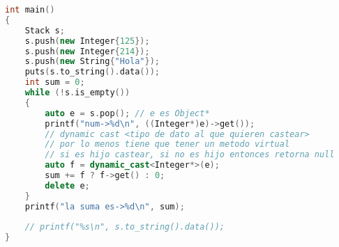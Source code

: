 \begin{lstlisting}[language=C++, caption={Aplicacion de polimorfismo}]
int main()
{
    Stack s;
    s.push(new Integer{125});
    s.push(new Integer{214});
    s.push(new String{"Hola"});
    puts(s.to_string().data());
    int sum = 0;
    while (!s.is_empty())
    {
        auto e = s.pop(); // e es Object*
        printf("num->%d\n", ((Integer*)e)->get());
        // dynamic cast <tipo de dato al que quieren castear>
        // por lo menos tiene que tener un metodo virtual
        // si es hijo castear, si no es hijo entonces retorna null
        auto f = dynamic_cast<Integer*>(e);
        sum += f ? f->get() : 0;
        delete e;
    }
    printf("la suma es->%d\n", sum);
    
    // printf("%s\n", s.to_string().data());
}
\end{lstlisting}

